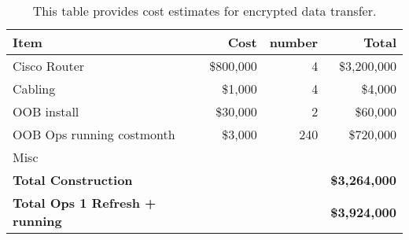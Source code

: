 \tiny \begin{longtable} {|l|r|r|r|} \caption{This table provides cost estimates for encrypted data transfer. \label{tab:ipsec}}\\ 
\hline 
\textbf{Item}&\textbf{Cost}&\textbf{number}&\textbf{Total} \\ \hline
{Cisco Router }&{\$800,000}&{4}&{\$3,200,000} \\ \hline
{Cabling}&{\$1,000}&{4}&{\$4,000} \\ \hline
{OOB install}&{\$30,000}&{2}&{\$60,000} \\ \hline
{OOB Ops running cost\/month}&{\$3,000}&{240}&{\$720,000} \\ \hline
{Misc}&&& \\ \hline
\textbf{Total Construction}&\textbf{}&\textbf{}&\textbf{\$3,264,000} \\ \hline
\textbf{Total Ops 1 Refresh  + running }&\textbf{}&\textbf{}&\textbf{\$3,924,000} \\ \hline
\end{longtable} \normalsize
